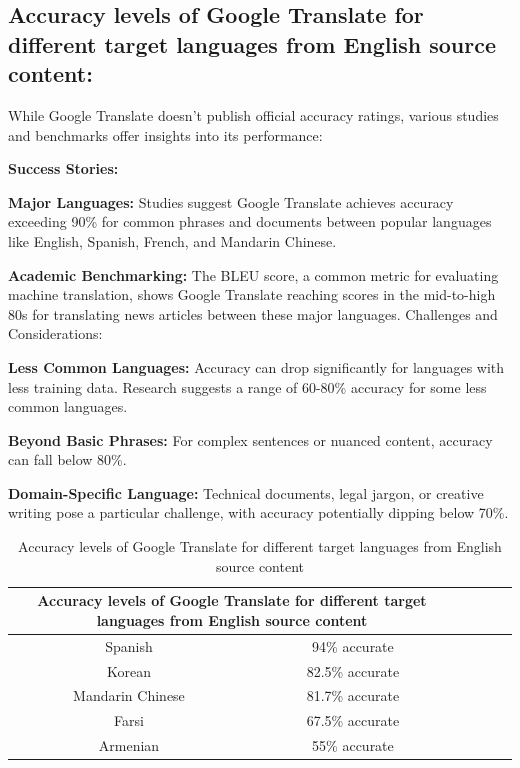 \documentclass[12px, a4paper]{article}
\begin{document}
    \subsection{Accuracy levels of Google Translate for different target languages from English source content:}

    While Google Translate doesn't publish official accuracy ratings, various studies and benchmarks offer insights into its performance:

    \textbf{Success Stories:}

    \textbf{Major Languages:} Studies suggest Google Translate achieves accuracy exceeding 90\% for common phrases and documents between popular languages like English, Spanish, French, and Mandarin Chinese.

    \textbf{Academic Benchmarking:} The BLEU score, a common metric for evaluating machine translation, shows Google Translate reaching scores in the mid-to-high 80s for translating news articles between these major languages.
    Challenges and Considerations:

    \textbf{Less Common Languages:} Accuracy can drop significantly for languages with less training data. Research suggests a range of 60-80\% accuracy for some less common languages.

    \textbf{Beyond Basic Phrases:} For complex sentences or nuanced content, accuracy can fall below 80\%.

    \textbf{Domain-Specific Language:} Technical documents, legal jargon, or creative writing pose a particular challenge, with accuracy potentially dipping below 70\%.

\begin{table}[!h]
    \centering
    \begin{tabular}{|c|c|c|c|c|c|}
        \hline
        \multicolumn{2}{|c|}{\textbf{Accuracy levels of Google Translate for different target languages from English source content}} \\
        \hline

        Spanish & 94\% accurate\\
        \hline
        Korean & 82.5\% accurate\\
        \hline
        Mandarin Chinese & 81.7\% accurate\\
        \hline
        Farsi & 67.5\% accurate\\
        \hline
        Armenian & 55\% accurate\\
        \hline

    \end{tabular}
    \caption{Accuracy levels of Google Translate for different target languages from English source content}
\end{table}
\end{document}
